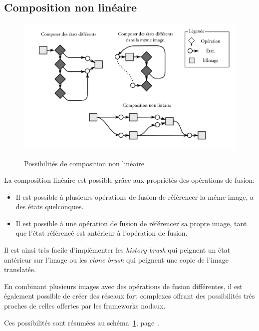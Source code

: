 		\subsection{Composition non linéaire}
		\begin{figure}[ht]
			\centering
			\includegraphics[width=\textwidth]{images/compnonlin} 
			\label{fig:compnonlin}
			\caption{Possibilités de composition non linéaire}
		\end{figure}
			La composition linéaire est possible grâce aux propriétés des opérations de fusion:
			\begin{itemize}
				\item Il est possible à plusieurs opérations de fusion de référencer la méme image, a des états quelconques.
				\item Il est possible à une opération de fusion de référencer sa propre image, tant que l'état référencé est antérieur
				à l'opération de fusion.
			\end{itemize}
			Il est ainsi très facile d'implémenter les \emph{history brush} qui peignent un état antérieur sur l'image ou les \emph{clone brush}
			qui peignent une copie de l'image translatée. 

			En combinant plusieurs images avec des opérations de fusion différentes, il est également possible de créer des réseaux fort complexes
			offrant des possibilités très proches de celles offertes par les frameworks nodaux. 

			Ces possibilités sont résumées au schéma~\ref{fig:compnonlin}, page~\pageref{fig:compnonlin}.


